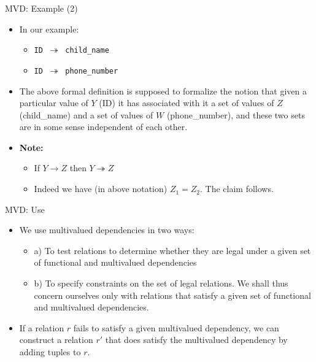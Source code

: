 \documentclass[aspectratio=169, xcolor=dvipsnames]{beamer}
\begin{document}
\begin{frame}{MVD: Example (2)}
    \begin{itemize}[<+->]
        \item In our example:
        \begin{itemize}
            \item[$\triangleright$] \texttt{ID $\twoheadrightarrow$ child\_name}
            \item[$\triangleright$] \texttt{ID $\twoheadrightarrow$ phone\_number}
        \end{itemize}
        \item The above formal definition is supposed to formalize the notion that given a particular value of $Y$ (ID) it has associated with it a set of values of $Z$ (child\_name) and a set of values of $W$ (phone\_number), and these two sets are in some sense independent of each other.
        \item \textbf{Note:}
        \begin{itemize}
            \item[$\triangleright$] If $Y \rightarrow Z$ then $Y \twoheadrightarrow Z$
            \item[$\triangleright$] Indeed we have (in above notation) $Z_1 = Z_2$. The claim follows.
        \end{itemize}
    \end{itemize}
\end{frame}

\begin{frame}{MVD: Use}
    \begin{itemize}[<+->]
        \item We use multivalued dependencies in two ways:
        \begin{itemize}
            \item[$\triangleright$] a) To test relations to determine whether they are legal under a given set of functional and multivalued dependencies
            \item[$\triangleright$] b) To specify constraints on the set of legal relations. We shall thus concern ourselves only with relations that satisfy a given set of functional and multivalued dependencies.
        \end{itemize}
        \item If a relation $r$ fails to satisfy a given multivalued dependency, we can construct a relation $r'$ that does satisfy the multivalued dependency by adding tuples to $r$.
    \end{itemize}
\end{frame}
\end{document}
